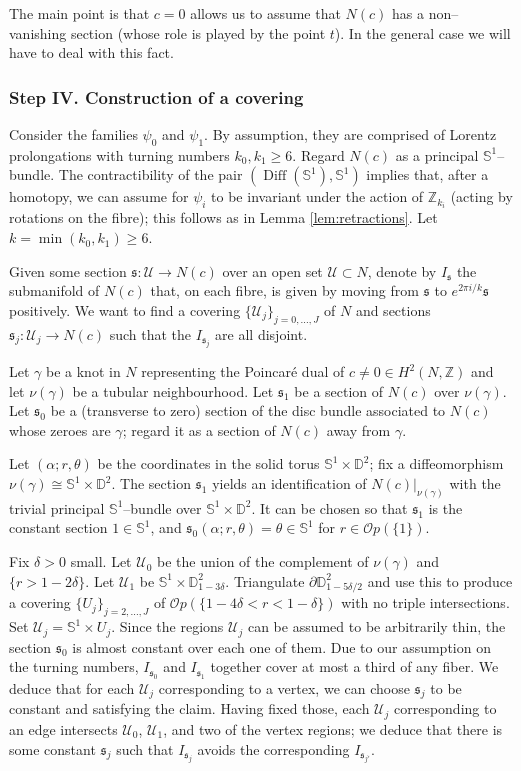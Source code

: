 \documentclass[10pt]{amsart}
\newcommand{\Diff}{\operatorname{Diff}}
\newcommand{\s}{{\mathfrak{s}}}
\newcommand{\SU}{{\mathcal{U}}}
\newcommand{\Z}{{\mathbb{Z}}}
\newcommand{\NS}{{\mathbb{S}}}
\newcommand{\D}{{\mathbb{D}}}
\newcommand{\Op}{{\mathcal{O}p}}
\theoremstyle{definition}
\begin{document}
The main point is that $c=0$ allows us to assume that $N(c)$ has a non--vanishing section (whose role is played by the point $t$). In the general case we will have to deal with this fact.

\subsubsection{Step IV. Construction of a covering}

Consider the families $\psi_0$ and $\psi_1$. By assumption, they are comprised of Lorentz prolongations with turning numbers $k_0,k_1\geq6$. Regard $N(c)$ as a principal $\NS^1$--bundle. The contractibility of the pair $(\Diff(\NS^1),\NS^1)$ implies that, after a homotopy, we can assume for $\psi_i$ to be invariant under the action of $\Z_{k_i}$ (acting by rotations on the fibre); this follows as in Lemma \ref{lem:retractions}. Let $k = \min(k_0,k_1) \geq 6$.

Given some section $\s: \SU \to N(c)$ over an open set $\SU \subset N$, denote by $I_\s$ the submanifold of $N(c)$ that, on each fibre, is given by moving from $\s$ to $e^{2\pi i/k}\s$ positively. We want to find a covering $\{\SU_j\}_{j=0,\dots,J}$ of $N$ and sections $\s_j: \SU_j \to N(c)$ such that the $I_{\s_j}$ are all disjoint.

Let $\gamma$ be a knot in $N$ representing the Poincar\'e dual of $c \neq 0 \in H^2(N,\Z)$ and let $\nu(\gamma)$ be a tubular neighbourhood. Let $\s_1$ be a section of $N(c)$ over $\nu(\gamma)$. Let $\s_0$ be a (transverse to zero) section of the disc bundle associated to $N(c)$ whose zeroes are $\gamma$; regard it as a section of $N(c)$ away from $\gamma$.

Let $(\alpha;r,\theta)$ be the coordinates in the solid torus $\NS^1 \times \D^2$; fix a diffeomorphism $\nu(\gamma) \cong \NS^1 \times \D^2$. The section $\s_1$ yields an identification of $N(c)|_{\nu(\gamma)}$ with the trivial principal $\NS^1$--bundle over $\NS^1 \times \D^2$. It can be chosen so that $\s_1$ is the constant section $1 \in \NS^1$, and $\s_0(\alpha;r,\theta) = \theta \in \NS^1$ for $r \in \Op(\{1\})$.

Fix $\delta>0$ small. Let $\SU_0$ be the union of the complement of $\nu(\gamma)$ and $\{r>1-2\delta\}$. Let $\SU_1$ be $\NS^1 \times \D^2_{1-3\delta}$. Triangulate $\partial\D^2_{1-5\delta/2}$ and use this to produce a covering $\{U_j\}_{j=2,\dots,J}$ of $\Op(\{1-4\delta < r < 1-\delta\})$ with no triple intersections. Set $\SU_j = \NS^1 \times U_j$. Since the regions $\SU_j$ can be assumed to be arbitrarily thin, the section $\s_0$ is almost constant over each one of them. Due to our assumption on the turning numbers, $I_{\s_0}$ and $I_{\s_1}$ together cover at most a third of any fiber. We deduce that for each $\SU_j$ corresponding to a vertex, we can choose $\s_j$ to be constant and satisfying the claim. Having fixed those, each $\SU_j$ corresponding to an edge intersects $\SU_0$, $\SU_1$, and two of the vertex regions; we deduce that there is some constant $\s_j$ such that $I_{\s_j}$ avoids the corresponding $I_{\s_{j'}}$.
\end{document}
